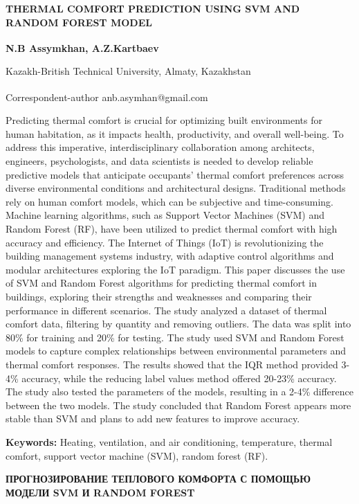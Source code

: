 
{\bfseries THERMAL COMFORT PREDICTION USING SVM AND RANDOM FOREST MODEL}

{\bfseries N.B Assymkhan\textsuperscript{\envelope }, A.Z.Kartbaev}

Kazakh-British Technical University, Almaty, Kazakhstan

{\bfseries \textsuperscript{\envelope }}Correspondent-author anb.asymhan@gmail.com

Predicting thermal comfort is crucial for optimizing built environments
for human habitation, as it impacts health, productivity, and overall
well-being. To address this imperative, interdisciplinary collaboration
among architects, engineers, psychologists, and data scientists is
needed to develop reliable predictive models that anticipate occupants'
thermal comfort preferences across diverse environmental conditions and
architectural designs. Traditional methods rely on human comfort models,
which can be subjective and time-consuming. Machine learning algorithms,
such as Support Vector Machines (SVM) and Random Forest (RF), have been
utilized to predict thermal comfort with high accuracy and efficiency.
The Internet of Things (IoT) is revolutionizing the building management
systems industry, with adaptive control algorithms and modular
architectures exploring the IoT paradigm. This paper discusses the use
of SVM and Random Forest algorithms for predicting thermal comfort in
buildings, exploring their strengths and weaknesses and comparing their
performance in different scenarios. The study analyzed a dataset of
thermal comfort data, filtering by quantity and removing outliers. The
data was split into 80\% for training and 20\% for testing. The study
used SVM and Random Forest models to capture complex relationships
between environmental parameters and thermal comfort responses. The
results showed that the IQR method provided 3-4\% accuracy, while the
reducing label values method offered 20-23\% accuracy. The study also
tested the parameters of the models, resulting in a 2-4\% difference
between the two models. The study concluded that Random Forest appears
more stable than SVM and plans to add new features to improve accuracy.

{\bfseries Keywords:} Heating, ventilation, and air conditioning,
temperature, thermal comfort, support vector machine (SVM), random
forest (RF).

{\bfseries ПРОГНОЗИРОВАНИЕ ТЕПЛОВОГО КОМФОРТА С ПОМОЩЬЮ МОДЕЛИ SVM И RANDOM
FOREST}

